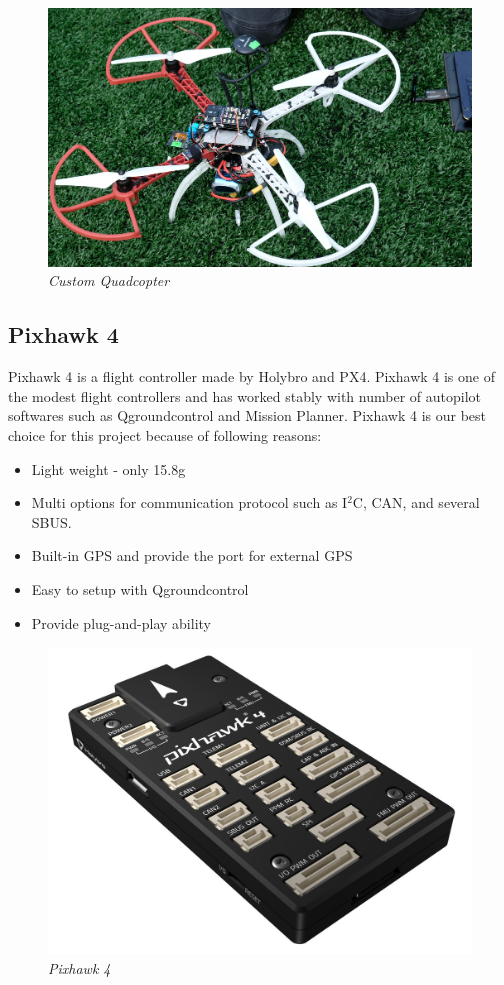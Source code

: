 \documentclass[11pt]{article}
\begin{document}
\begin{figure}[h!bt]
\centering	
\includegraphics[width=4.5 in]{quad}
\caption{\textit{Custom Quadcopter}}	
\end{figure}

\subsection{Pixhawk 4}
Pixhawk 4 is a flight controller made by Holybro and PX4. Pixhawk 4 is one of the modest flight controllers and has worked stably with number of autopilot softwares such as Qgroundcontrol and Mission Planner. Pixhawk 4 is our best choice for this project because of following reasons:

\begin{itemize}

\item Light weight - only 15.8g
\item Multi options for communication protocol such as I$^2$C, CAN, and several SBUS.
\item Built-in GPS and provide the port for external GPS
\item Easy to setup with Qgroundcontrol
\item Provide plug-and-play ability     

\end{itemize}

\begin{figure}[h!bt]
\centering	
\includegraphics[width=4.5 in]{pixhawk4}
\caption{\textit{Pixhawk 4}}	
\end{figure}
\end{document}
